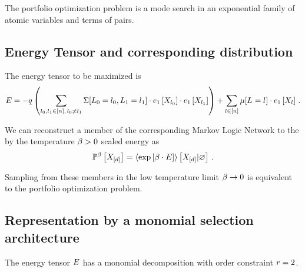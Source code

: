 \documentclass[aps,onecolumn,nofootinbib,pra]{article}
\begin{document}
The portfolio optimization problem is a mode search in an exponential family of atomic variables and terms of pairs.

\subsection{Energy Tensor and corresponding distribution}

The energy tensor to be maximized is
	\[ E = - q \left(\sum_{l_{0},l_{1}\in[n] , \, l_{0}\neq l_{1}} 
	\Sigma[L_{0}=l_{0},L_{1}=l_{1}] \cdot e_{1}\left[X_{l_{0}}\right]\cdot e_{1}\left[X_{l_{1}}\right]\right) 
	+ \sum_{l\in[n]} \mu[L_{}=l_{}] \cdot e_{1}\left[X_{l}\right] \, . \]

We can reconstruct a member of the corresponding Markov Logic Network to the by the temperature $\beta>0$ scaled energy as
\begin{align*}
	\mathbb{P}^{\beta}\left[X_{[d]}\right] = \left\langle \mathrm{exp}\left[\beta\cdot E\right]\right\rangle \left[ X_{[d]} | \varnothing \right] \, . 
\end{align*}

Sampling from these members in the low temperature limit $\beta\rightarrow 0$ is equivalent to the portfolio optimization problem.

\subsection{Representation by a monomial selection architecture}

The energy tensor $E$ has a monomial decomposition with order constraint $r=2$.
\end{document}
